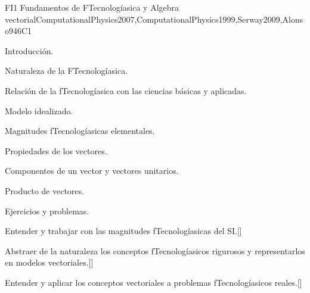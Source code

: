 \begin{syllabus}
\begin{unit}{}{FI1 Fundamentos de FTecnologíasica y Algebra vectorial}{ComputationalPhysics2007,ComputationalPhysics1999,Serway2009,Alonso94}{6}{C1}
\begin{topics}
      \item Introducción.
      \item Naturaleza de la FTecnologíasica.
      \item Relación de la fTecnologíasica con las ciencias básicas y aplicadas.
      \item Modelo idealizado.
      \item Magnitudes fTecnologíasicas  elementales.
      \item Propiedades de los vectores.
      \item Componentes de un vector y vectores unitarios.
      \item Producto de vectores.
      \item Ejercicios y problemas.
   \end{topics}

   \begin{learningoutcomes}
      \item Entender y trabajar con las magnitudes fTecnologíasicas del SI.[\Usage]
      \item Abstraer de la naturaleza los conceptos fTecnologíasicos rigurosos y representarlos en modelos vectoriales.[\Usage]
      \item Entender y aplicar los conceptos vectoriales a problemas fTecnologíasicos reales.[\Usage]
   \end{learningoutcomes}
\end{unit}


\end{syllabus}
